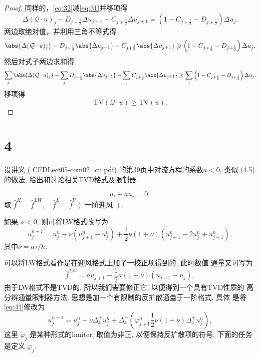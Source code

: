 \documentclass[12pt]{article}
\begin{document}
\begin{proof}
同样的，\cref{eq:32}减\cref{eq:31}并移项得
\begin{equation}
	{\Delta (\mathcal{Q} \cdot u)_{j}}-{D_{j-\frac{1}{2}} \Delta u_{j-1} - C_{j+\frac{3}{2}} \Delta u_{j+1}} = \left(1- C_{j+\frac{1}{2}}-D_{j+\frac{1}{2}} \right)\Delta u_{j} .
\end{equation}
两边取绝对值，并利用三角不等式得
\begin{equation}
	\abs{\Delta (\mathcal{Q} \cdot u)_{j}}-{D_{j-\frac{1}{2}} \abs{\Delta u_{j-1}} - C_{j+\frac{3}{2}} \abs{\Delta u_{j+1}}} \geqslant \left(1- C_{j+\frac{1}{2}}-D_{j+\frac{1}{2}} \right)\Delta u_{j} .
\end{equation}
然后对式子两边求和得
\begin{equation}
	\sum_j \abs{\Delta (\mathcal{Q} \cdot u)_{j}}-\sum_j {D_{j-\frac{1}{2}} \abs{\Delta u_{j-1}} - \sum_j C_{j+\frac{3}{2}} \abs{\Delta u_{j+1}}} \geqslant \sum_j \left(1- C_{j+\frac{1}{2}}-D_{j+\frac{1}{2}} \right)\Delta u_{j}.
\end{equation}
移项得
\begin{equation}
	\mathrm{TV}(\mathcal{Q}\cdot u)\geqslant \mathrm{TV}(u).
\end{equation}

\end{proof}


\section{4}


设讲义 ( CFDLect05-com02\_cn.pdf) 的第39页中对流方程的系数$a <0$, 类似 (4.5)的做法, 给出和讨论相关TVD格式及限制器.



\begin{equation}
u_{t}+a u_{x}=0,
\end{equation}
取  $\hat{f}^{H}=\hat{f}^{L W}, \quad \hat{f}^{L}=\hat{f}^{U}(\text { 一阶迎风 })$.

如果 $a<0$, 则可将LW格式改写为
\begin{equation}
u_{j}^{n+1}=u_{j}^{n}-\nu\left(u_{j+1}^{n}-u_{j}^{n}\right)+\frac{1}{2} \nu(1+\nu)\left(u_{j+1}^{n}-2 u_{j}^{n}+u_{j-1}^{n}\right),
\label{eq:41}
\end{equation}
其中$\nu=a\tau/h$.

可以将LW格式看作是在迎风格式上加了一校正项得到的, 此时数值 通量又可写为
\begin{equation}
\hat{f}^{L W}=a u_{j+1}-\frac{1}{2} a(1+\nu)\left(u_{j+1}-u_{j}\right),
\end{equation}
由于LW格式不是TVD的, 所以我们需要修正它, 以便得到一个具有TVD性质的 高分辨通量限制器方法. 思想是加一个有限制的反扩散通量于一阶格式, 具体 是将\cref{eq:41}修改为
\begin{equation}
u_{j}^{n+1}=u_{j}^{n}-\nu \Delta_{x}^{+} u_{j}^{n}+\Delta_{x}^{-}\left(\varphi_{j+1}^{n} \frac{1}{2} \nu(1+\nu) \Delta_{x}^{+} u_{j}^{n}\right),
\label{eq:42}
\end{equation}
这里 $\varphi_{j}$ 是某种形式的limiter, 取值为非正, 以便保持反扩散项的符号. 下面的任务是定义 $\varphi_{j} .$
\end{document}
